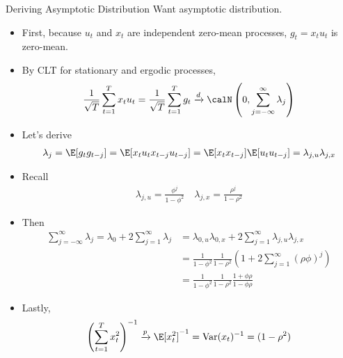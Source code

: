 \documentclass[handout]{beamer}
\newcommand{\Var}{\operatorname{Var}}
\newcommand{\pto}{\xrightarrow{p}}
\newcommand{\dto}{\xrightarrow{d}}
\newcommand{\sumtT}{\sum^T_{t=1}}
\begin{document}
\begin{frame}[shrink]{Deriving Asymptotic Distribution}
Want asymptotic distribution.
\begin{itemize}
  \item First, because $u_t$ and $x_t$ are independent zero-mean
    processes, $g_t=x_tu_t$ is zero-mean.

  \item By CLT for stationary and ergodic processes,
    \begin{align*}
      \frac{1}{\sqrt{T}}
      \sumtT
      x_tu_t
      =
      \frac{1}{\sqrt{T}}
      \sumtT
      g_t
      \dto
      \calN\left(
      0,
      \sum_{j=-\infty}^\infty
      \lambda_j
      \right)
    \end{align*}

  \item Let's derive
    \begin{align*}
      \lambda_j
      =
      \E[g_tg_{t-j}]
      =
      \E[x_tu_t x_{t-j}u_{t-j}]
      =
      \E[x_tx_{t-j}]
      \E[u_tu_{t-j}]
      =
      \lambda_{j,u}
      \lambda_{j,x}
    \end{align*}

  \item
    Recall
    \begin{align*}
      \lambda_{j,u}
      =
      \frac{\phi^j}{1-\phi^2}
      \quad
      \lambda_{j,x}
      =
      \frac{\rho^j}{1-\rho^2}
    \end{align*}
  \item Then
    \begin{align*}
      \sum_{j=-\infty}^\infty
      \lambda_j
      =
      \lambda_0
      + 2
      \sum_{j=1}^\infty
      \lambda_j
      &=
      \lambda_{0,u}
      \lambda_{0,x}
      +
      2
      \sum_{j=1}^\infty
      \lambda_{j,u}
      \lambda_{j,x}
      \\
      &=
      \frac{1}{1-\phi^2}
      \frac{1}{1-\rho^2}
      \left(
      1
      +
      2
      \sum_{j=1}^\infty
      (\rho\phi)^j
      \right)
      \\
      &=
      \frac{1}{1-\phi^2}
      \frac{1}{1-\rho^2}
      \frac{1+\phi\rho}{1-\phi\rho}
    \end{align*}
  \item
    Lastly,
    \begin{align*}
      \left(
      \sumtT x_t^2
      \right)^{-1}
      \pto
      \E[x_t^2]^{-1}
      =
      \Var(x_t)^{-1}
      =
      (1-\rho^2)
    \end{align*}
\end{itemize}
\end{frame}
\end{document}
